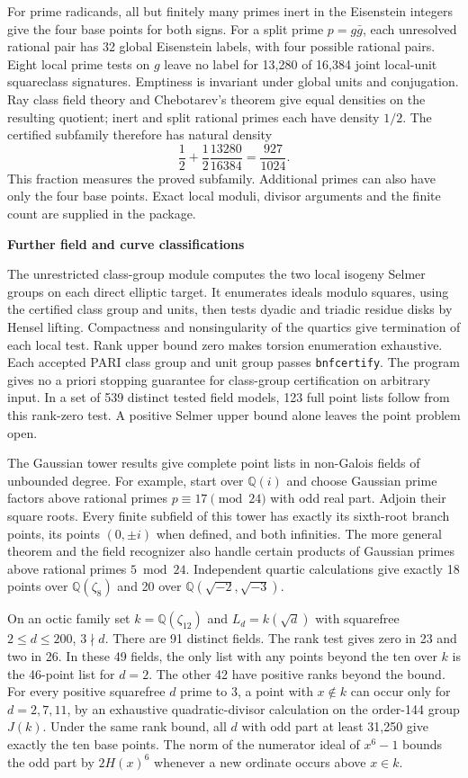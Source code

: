 \documentclass[12pt]{article}
\newcommand{\Q}{\mathbb Q}\newcommand{\Z}{\mathbb Z}\newcommand{\C}{C_6}
\newcommand{\heading}[1]{{\Large\bfseries\color{ink}#1}\par\smallskip}
\begin{document}
For prime radicands, all but finitely many primes inert in the Eisenstein integers give the four base points for both signs. For a split prime $p=g\bar g$, each unresolved rational pair has 32 global Eisenstein labels, with four possible rational pairs. Eight local prime tests on $g$ leave no label for 13,280 of 16,384 joint local-unit squareclass signatures. Emptiness is invariant under global units and conjugation. Ray class field theory and Chebotarev's theorem give equal densities on the resulting quotient; inert and split rational primes each have density $1/2$. The certified subfamily therefore has natural density
\[
             \frac12+\frac12\frac{13280}{16384}=\frac{927}{1024}.
\]
This fraction measures the proved subfamily. Additional primes can also have only the four base points. Exact local moduli, divisor arguments and the finite count are supplied in the package.

\newpage
\heading{Further field and curve classifications}
The unrestricted class-group module computes the two local isogeny Selmer groups on each direct elliptic target. It enumerates ideals modulo squares, using the certified class group and units, then tests dyadic and triadic residue disks by Hensel lifting. Compactness and nonsingularity of the quartics give termination of each local test. Rank upper bound zero makes torsion enumeration exhaustive. Each accepted PARI class group and unit group passes \texttt{bnfcertify}. The program gives no a priori stopping guarantee for class-group certification on arbitrary input. In a set of 539 distinct tested field models, 123 full point lists follow from this rank-zero test. A positive Selmer upper bound alone leaves the point problem open.

The Gaussian tower results give complete point lists in non-Galois fields of unbounded degree. For example, start over $\Q(i)$ and choose Gaussian prime factors above rational primes $p\equiv17\pmod{24}$ with odd real part. Adjoin their square roots. Every finite subfield of this tower has exactly its sixth-root branch points, its points $(0,\pm i)$ when defined, and both infinities. The more general theorem and the field recognizer also handle certain products of Gaussian primes above rational primes $5\bmod24$. Independent quartic calculations give exactly 18 points over $\Q(\zeta_8)$ and 20 over $\Q(\sqrt{-2},\sqrt{-3})$.

On an octic family set $k=\Q(\zeta_{12})$ and $L_d=k(\sqrt d)$ with squarefree $2\le d\le200$, $3\nmid d$. There are 91 distinct fields. The rank test gives zero in 23 and two in 26. In these 49 fields, the only list with any points beyond the ten over $k$ is the 46-point list for $d=2$. The other 42 have positive ranks beyond the bound. For every positive squarefree $d$ prime to 3, a point with $x\notin k$ can occur only for $d=2,7,11$, by an exhaustive quadratic-divisor calculation on the order-144 group $J(k)$. Under the same rank bound, all $d$ with odd part at least 31,250 give exactly the ten base points. The norm of the numerator ideal of $x^6-1$ bounds the odd part by $2H(x)^6$ whenever a new ordinate occurs above $x\in k$.
\end{document}
